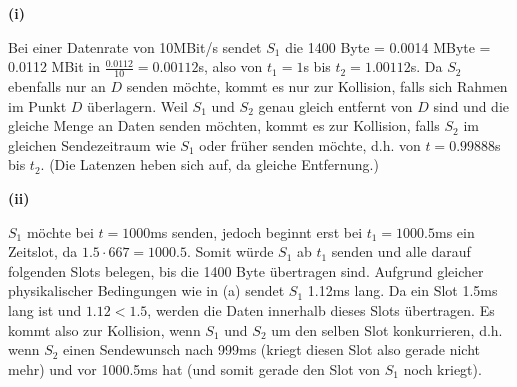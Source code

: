 \documentclass{../exercisesheet}
\begin{document}
\begin{exercise}{6}
\begin{subexercise}
\textbf{(i)}
\begin{adjustwidth}{2em}{0em}\vspace{-\baselineskip}
	Bei einer Datenrate von 10MBit/s sendet $S_1$ die 1400 Byte = 0.0014 MByte = 0.0112 MBit in $\frac{0.0112}{10}=0.00112$s, also von $t_1=1$s bis $t_2=1.00112$s. Da $S_2$ ebenfalls nur an
	$D$ senden möchte, kommt es nur zur Kollision, falls sich Rahmen im Punkt $D$ überlagern. Weil $S_1$ und $S_2$ genau gleich entfernt von $D$ sind und die gleiche Menge an Daten
 	senden möchten, kommt es zur Kollision, falls $S_2$ im gleichen Sendezeitraum wie $S_1$ oder früher senden möchte, d.h. von $t=0.99888$s bis $t_2$. (Die Latenzen heben sich auf, da
	gleiche Entfernung.)\\
\end{adjustwidth}
\textbf{(ii)}
\begin{adjustwidth}{2em}{0em}\vspace{-\baselineskip}
	$S_1$ möchte bei $t=1000$ms senden, jedoch beginnt erst bei $t_1=1000.5$ms ein Zeitslot, da $1.5 \cdot 667 = 1000.5$. Somit würde $S_1$ ab $t_1$ senden und alle
	darauf folgenden Slots belegen, bis die 1400 Byte übertragen sind. Aufgrund gleicher physikalischer Bedingungen wie in (a) sendet $S_1$ 1.12ms lang. 
	Da ein Slot 1.5ms lang ist und $1.12<1.5$, werden die Daten innerhalb dieses Slots übertragen. Es kommt also zur Kollision, wenn $S_1$ und $S_2$ um den selben Slot konkurrieren,
	d.h. wenn $S_2$ einen Sendewunsch nach 999ms (kriegt diesen Slot also gerade nicht mehr) und vor 1000.5ms hat (und somit gerade den Slot von $S_1$ noch kriegt).\\
\end{adjustwidth}

\end{subexercise}
\end{exercise}
\end{document}
